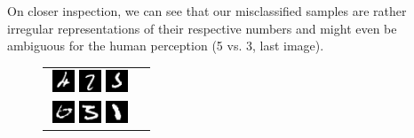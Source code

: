 \documentclass{article}
\begin{document}
On closer inspection, we can see that our misclassified samples are rather irregular representations of their respective numbers and might even be ambiguous for the human perception (5 vs. 3, last image).

\begin{figure}
\centering
\begin{tabular}{cc}
  \includegraphics[width=0.27\textwidth]{imgs/mis1.png}    \includegraphics[width=0.27\textwidth]{imgs/mis2.png}    \includegraphics[width=0.27\textwidth]{imgs/mis3.png} \\
 \includegraphics[width=0.27\textwidth]{imgs/mis4.png}    \includegraphics[width=0.27\textwidth]{imgs/mis5.png}    \includegraphics[width=0.27\textwidth]{imgs/mis6.png} \\

\end{tabular}
\end{figure}
\end{document}
